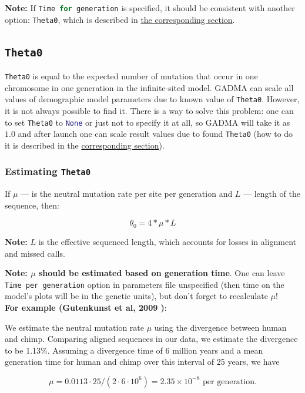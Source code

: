 \documentclass[12pt]{article}
\makeatletter
\newcommand{\py}[1]{\lstinline[language=Python, showstringspaces=False]@#1@}
\makeatother
\begin{document}
\textbf{Note: } If \py{Time for generation} is specified, it should be consistent with another option: \py{Theta0}, which is described in \hyperref[sec:est-theta]{the corresponding section}.

\subsection{\py{Theta0}}
\py{Theta0} is equal to the expected number of mutation that occur in one chromosome in one generation in the infinite-sited model. GADMA can scale all values of demographic model parameters due to known value of \py{Theta0}. However, it is not always possible to find it. There is a way to solve this problem: one can to set \py{Theta0} to \py{None} or just not to specify it at all, so GADMA will take it as $1.0$ and after launch one can scale result values due to found \py{Theta0} (how to do it is described in the \hyperref[sec:change-theta]{corresponding section}). 

\subsubsection{Estimating \py{Theta0}}
\label{sec:est-theta}
If $\mu$ --- is the neutral mutation rate per site per generation and $L$ --- length of the sequence, then:

$$\theta_0 = 4 * \mu * L$$

\textbf{Note: } $L$ is the effective sequenced length, which accounts for losses in alignment and missed calls.

\textbf{Note:  $\mu$ should be estimated based on generation time}. One can leave \py{Time per generation} option in parameters file unspecified (then time on the model's plots will be in the genetic units), but don't forget to recalculate $\mu$! \\

\textbf{For example (Gutenkunst et al, 2009 \cite{gutenkunst2009})}:

\begin{displayquote}
We estimate the neutral mutation rate $\mu$ using the divergence between human and chimp. Comparing aligned sequences in our data, we estimate the divergence to be 1.13\%. Assuming a divergence time of 6 million years and a mean generation time for human and chimp over this interval of 25 years, we have

$$\mu = 0.0113 \cdot 25 / (2 \cdot 6 \cdot 10^6) = 2.35 \times 10^{-8}\text{ per generation}.$$
\end{displayquote}
\end{document}
